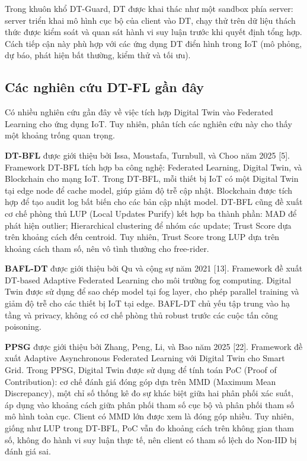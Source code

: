 Trong khuôn khổ DT-Guard, DT được khai thác như một sandbox phía server: server triển khai mô hình cục bộ của client vào DT, chạy thử trên dữ liệu thách thức được kiểm soát và quan sát hành vi suy luận trước khi quyết định tổng hợp. Cách tiếp cận này phù hợp với các ứng dụng DT điển hình trong IoT (mô phỏng, dự báo, phát hiện bất thường, kiểm thử và tối ưu).

\subsection{Các nghiên cứu DT-FL gần đây}
Có nhiều nghiên cứu gần đây về việc tích hợp Digital Twin vào Federated Learning cho ứng dụng IoT. Tuy nhiên, phân tích các nghiên cứu này cho thấy một khoảng trống quan trọng.

\textbf{DT-BFL} được giới thiệu bởi Issa, Moustafa, Turnbull, và Choo năm 2025 {[}5{]}. Framework DT-BFL tích hợp ba công nghệ: Federated Learning, Digital Twin, và Blockchain cho mạng IoT. Trong DT-BFL, mỗi thiết bị IoT có một Digital Twin tại edge node để cache model, giúp giảm độ trễ cập nhật. Blockchain được tích hợp để tạo audit log bất biến cho các bản cập nhật model. DT-BFL cũng đề xuất cơ chế phòng thủ LUP (Local Updates Purify) kết hợp ba thành phần: MAD để phát hiện outlier; Hierarchical clustering để nhóm các update; Trust Score dựa trên khoảng cách đến centroid. Tuy nhiên, Trust Score trong LUP dựa trên khoảng cách tham số, nên vô tình thưởng cho free-rider.

\textbf{BAFL-DT} được giới thiệu bởi Qu và cộng sự năm 2021 {[}13{]}. Framework đề xuất DT-based Adaptive Federated Learning cho môi trường fog computing. Digital Twin được sử dụng để sao chép model tại fog layer, cho phép parallel training và giảm độ trễ cho các thiết bị IoT tại edge. BAFL-DT chủ yếu tập trung vào hạ tầng và privacy, không có cơ chế phòng thủ robust trước các cuộc tấn công poisoning.

\textbf{PPSG} được giới thiệu bởi Zhang, Peng, Li, và Bao năm 2025 {[}22{]}. Framework đề xuất Adaptive Asynchronous Federated Learning với Digital Twin cho Smart Grid. Trong PPSG, Digital Twin được sử dụng để tính toán PoC (Proof of Contribution): cơ chế đánh giá đóng góp dựa trên MMD (Maximum Mean Discrepancy), một chỉ số thống kê đo sự khác biệt giữa hai phân phối xác suất, áp dụng vào khoảng cách giữa phân phối tham số cục bộ và phân phối tham số mô hình toàn cục. Client có MMD lớn được xem là đóng góp nhiều. Tuy nhiên, giống như LUP trong DT-BFL, PoC vẫn đo khoảng cách trên không gian tham số, không đo hành vi suy luận thực tế, nên client có tham số lệch do Non-IID bị đánh giá sai.

